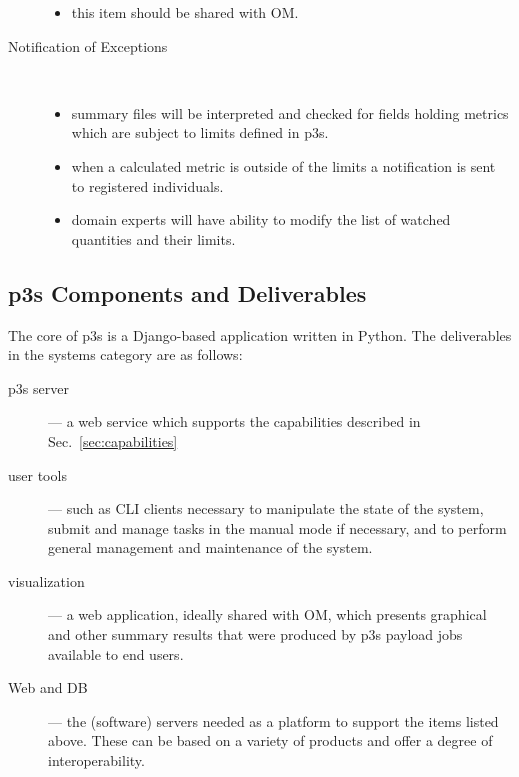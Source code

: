 \documentclass[pdftex,12pt,letter]{article}
\begin{document}
\begin{description}
\begin{itemize}
\item this item should be shared with OM. 

\end{itemize} 

\item[Notification of Exceptions]\ 
\begin{itemize}

\item summary files will be interpreted and checked for fields holding metrics which are subject to limits defined in p3s.

\item when a calculated metric is outside of the limits a notification is sent to registered individuals. 

\item domain experts will have ability to modify the list of watched quantities and their limits.

\end{itemize} 

\end{description}

\subsection{p3s Components and Deliverables}

The core of p3s is a Django-based \cite{django} application written in Python. The
deliverables in the systems category are as follows:

\begin{description}
\item[p3s server] --- a web service which supports the capabilities
  described in Sec.~\ref{sec:capabilities}

\item[user tools] --- such as CLI clients necessary to manipulate the
  state of the system, submit and manage tasks in the manual mode if
  necessary, and to perform general management and maintenance of the
  system.

\item[visualization] --- a web application, ideally shared with OM,
  which presents graphical and other summary results that were
  produced by p3s payload jobs available to end users.


\item[Web and DB] --- the (software) servers needed as a platform to
  support the items listed above. These can be based on a variety of
  products and offer a degree of interoperability.

\end{description}
\end{document}
